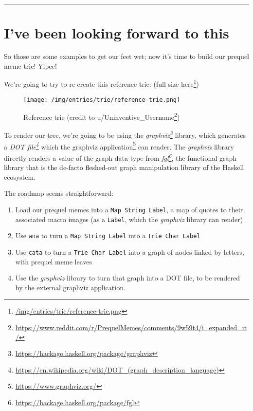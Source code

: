 \documentclass[]{article}
\renewcommand{\href}[2]{#2\footnote{\url{#1}}}
\begin{document}
\begin{center}\rule{0.5\linewidth}{\linethickness}\end{center}

\hypertarget{ive-been-looking-forward-to-this}{%
\section{I've been looking forward to
this}\label{ive-been-looking-forward-to-this}}

So those are some examples to get our feet wet; now it's time to build our
prequel meme trie! Yipee!

We're going to try to re-create this reference trie:
(\href{/img/entries/trie/reference-trie.png}{full size here})

\begin{figure}
\centering
\texttt{[image: /img/entries/trie/reference-trie.png]}
\caption{Reference trie (credit to
\href{https://www.reddit.com/r/PrequelMemes/comments/9w59t4/i_expanded_it/}{u/Uninventive\_Username})}
\end{figure}

To render our tree, we're going to be using the
\emph{\href{https://hackage.haskell.org/package/graphviz}{graphviz}} library,
which generates a
\emph{\href{https://en.wikipedia.org/wiki/DOT_(graph_description_language)}{DOT
file}} which the \href{https://www.graphviz.org/}{graphviz application} can
render. The \emph{graphviz} library directly renders a value of the graph data
type from \emph{\href{https://hackage.haskell.org/package/fgl}{fgl}}, the
functional graph library that is the de-facto fleshed-out graph manipulation
library of the Haskell ecosystem.

The roadmap seems straightforward:

\begin{enumerate}
\def\labelenumi{\arabic{enumi}.}
\tightlist
\item
  Load our prequel memes into a \texttt{Map\ String\ Label}, a map of quotes to
  their associated macro images (as a \texttt{Label}, which the \emph{graphviz}
  library can render)
\item
  Use \texttt{ana} to turn a \texttt{Map\ String\ Label} into a
  \texttt{Trie\ Char\ Label}
\item
  Use \texttt{cata} to turn a \texttt{Trie\ Char\ Label} into a graph of nodes
  linked by letters, with prequel meme leaves
\item
  Use the \emph{graphviz} library to turn that graph into a DOT file, to be
  rendered by the external graphviz application.
\end{enumerate}
\end{document}
